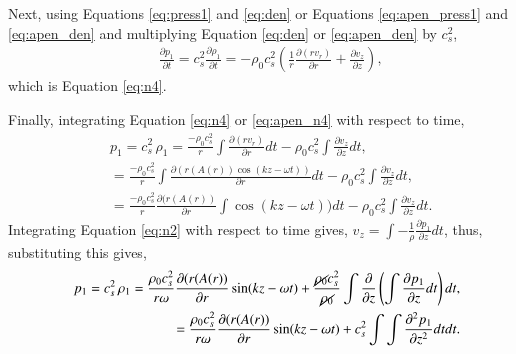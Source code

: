 Next, using Equations \ref{eq:press1} and \ref{eq:den} or Equations \ref{eq:apen_press1} and \ref{eq:apen_den} and multiplying Equation \ref{eq:den} or \ref{eq:apen_den} by $c_s^2$,
\begin{align}
&&\frac{\partial p_1}{\partial t}=c_s^2\frac{\partial\rho_1}{\partial t}=-\rho_0 c_s^2\left(\frac{1}{r}\frac{\partial(rv_r)}{\partial r}+\frac{\partial v_z}{\partial z}\right)\label{eq:apen_n4},
\end{align}
which is Equation \ref{eq:n4}.

Finally, integrating Equation \ref{eq:n4} or \ref{eq:apen_n4} with respect to time,
\begin{align}
&& p_1 =c_s^2\,\rho_1 = \frac{-\rho_0 c_s^2}{r} \int \frac{\partial(rv_r)}{\partial r} dt - \rho_0 c_s^2 \int \frac{\partial v_z}{\partial z} dt, \\
&& =\frac{-\rho_0 c_s^2}{r} \int \frac{\partial(r(A(r))\cos(kz-\omega t))}{\partial r} dt - \rho_0 c_s^2 \int \frac{\partial v_z}{\partial z} dt, \\
&& =\frac{-\rho_0 c_s^2}{r} \frac{\partial(r(A(r))}{\partial r} \int \cos(kz-\omega t)) dt - \rho_0 c_s^2 \int \frac{\partial v_z}{\partial z} dt.
\end{align}
Integrating Equation \ref{eq:n2} with respect to time gives, $v_z = \int -\frac{1}{\rho} \frac{\partial p_1}{\partial z} dt$, thus, substituting this gives,
\begin{align}
&& p_1 = c_s^2\,\rho_1 =\frac{\rho_0 c_s^2}{r\omega}\frac{\partial(r(A(r))}{\partial r} \sin(kz-\omega t) + \frac{\cancel{\rho_0} c_s^2}{\cancel{\rho_0}} \int \frac{\partial}{\partial z} \left(\int \frac{\partial p_1}{\partial z} dt \right) dt,\\
&& = \frac{\rho_0 c_s^2}{r\omega}\frac{\partial(r(A(r))}{\partial r} \sin(kz-\omega t)  + c_s^2 \int\int \frac{\partial^2 p_1}{\partial z^2} dt dt.\label{eq:apen_wow}
\end{align}


